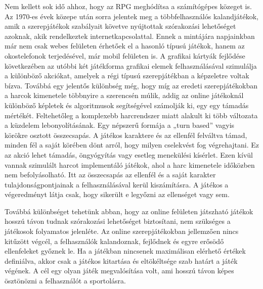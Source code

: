 
Nem kellett sok idő ahhoz, hogy az RPG meghódítsa a számítógépes közeget is. 
Az 1970-es évek közepe után sorra jelentek meg a többfelhasználós kalandjátékok, amik a szerepjátékok szabályait követve nyújtottak szórakozási lehetőséget azoknak, akik rendelkeztek internetkapcsolattal. 
Ennek a mintájára napjainkban már nem csak webes felületen érhetőek el a hasonló típusú játékok, hanem az okostelefonok terjedésével, már mobil felületen is. 
A grafikai kártyák fejlődése következében az utóbbi két játékforma grafikai elemek felhasználásával szimulálja a különböző akciókat, amelyek a régi típusú szerepjátékban a képzeletre voltak bízva. 
Továbbá egy jelentős különbség még, hogy míg az eredeti szerepjátékokban a harcok kimenetele többnyire a szerencsén múlik, addig az online játékoknál különböző képletek és algoritmusok segítségével számolják ki, egy egy támadás mértékét. 
Feltehetőleg a komplexebb harcrendszer miatt alakult ki több változata a küzdelem lebonyolításának. 
Egy népszerű formája a „turn based” vagyis körökre osztott összecsapás. 
A játékos karaktere és az ellenfél felváltva támad, minden fél a saját körében dönt arról, hogy milyen cselekvést fog végrehajtani. 
Ez az akció lehet támadás, öngyógyítás vagy esetleg menekülési kísérlet. 
Ezen kívül vannak szimulált harcot implementáló játékok, ahol a harc kimenetele időközben nem befolyásolható.
Itt az összecsapás az ellenfél és a saját karakter tulajdonságpontjainak a felhasználásával kerül kiszámításra. 
A játékos a végeredményt látja csak, hogy sikerült e legyőzni az ellenséget vagy sem. 

Továbbá különbséget tehetünk abban, hogy az online felületen játszható játékok hosszú távon tudnak szórakozási lehetőséget biztosítani, nem szükséges a játékosok folyamatos jelenléte. 
Az online szerepjátékokban jellemzően nincs kitűzött végcél, a felhasználók kalandoznak, fejlődnek és egyre erősödő ellenfeleket győznek le. 
Ha a játékban nincsenek maximálisan elérhető értékek definiálva, akkor  csak a játékos kitartása és eltökéltsége szab határt a játék végének. 
A cél egy olyan játék megvalósítása volt, ami hosszú távon képes ösztönözni a felhasználót a sportolásra.

\newpage







